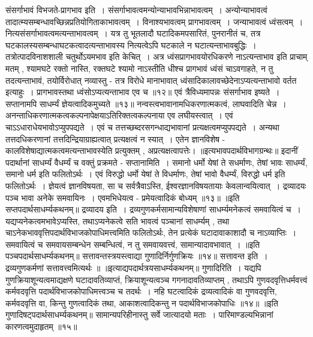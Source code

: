 संसर्गाभावं विभजते-प्रागभाव इति~। संसर्गाभावत्वमन्योन्याभावभिन्नाभावत्वम्~। अन्योन्याभावत्वं तादात्म्यसम्बन्धावच्छिन्नप्रतियोगिताकाभावत्वम्~।
विनाश्यभावत्वम् प्रागभावत्वम्~। जन्याभावत्वं ध्वंसत्वम्~। नित्यसंसर्गाभावत्वमत्यन्ताभावत्वम्~। यत्र तु भूतलादौ घटादिकमपसारितं, पुनरानीतं च, तत्र
घटकालस्यसम्बन्धाघटकत्वादत्यन्ताभावस्य नित्यत्वेऽपि घटकाले न घटात्यन्ताभावबुद्धिः~। तत्रोत्पादविनाशशाली चतुर्थोऽयमभाव इति केचित्~।
अत्र ध्वंसप्रागभावयोरधिकरणे नाऽत्यन्ताभाव इति प्राचाम् मतम् , श्यामघटे रक्तो नास्ति, रक्तघटे श्यामो नाऽस्तीति धीश्च प्रागभावं ध्वंसं चाऽवगाहते, न तु
तदत्यन्ताभावं, तयोर्विरोधात् नव्यास्तु - तत्र विरोधे मानाभावात् ध्वंसादिकालावच्छेदेनाऽप्यत्यन्ताभावो वर्तत इत्याहुः~।
प्रागभावस्तथा ध्वंसोऽप्यत्यन्ताभाव एव च ॥१२॥
एवं त्रैविध्यमापन्नः संसर्गाभाव इष्यते~।
सप्तानामपि साधर्म्यं ज्ञेयत्वादिकमुच्यते ॥१३॥
नन्वस्त्वभावानामधिकरणात्मकत्वं, लाघवादिति चेन्न~। अनन्ताधिकरणात्मकत्वकल्पनापेक्षयाऽतिरिक्तत्वकल्पनाया एव लघीयस्त्वात्~। एवं चाऽऽधाराधेयभावोऽप्युपपद्यते~।
एवं च तत्तच्छब्दरसगन्धाद्यभावानां प्रत्यक्षत्वमप्युपपद्यते~। अन्यथा तत्तदधिकरणानां तत्तदिन्द्रियाग्राह्यत्वात् प्रत्यक्षत्वं न स्यात्~।
एतेन ज्ञानविशेष - कालविशेषाद्यात्मकत्वमत्यन्ताभावस्येति प्रत्युक्तम् , अप्रत्यक्षत्वापत्तेः।
॥इत्यभावपदार्थविभागग्रन्थः॥
इदानीं पदार्थानां साधर्म्यं वैधर्म्यं च वक्तुं प्रक्रमते - सप्तानामिति~। समानो धर्मो येषां ते सधर्माणः, तेषां भावः साधर्म्यं, समानो धर्म इति फलितोऽर्थः~। एवं विरुद्धो
धर्मो येषां ते विधर्माणः, तेषां भावो वैधर्म्यं, विरुद्धो धर्म इति फलितोऽर्थः~। ज्ञेयत्वं ज्ञानविषयता, सा च सर्वत्रैवाऽस्ति, ईश्वरज्ञानविषयतायाः केवलान्वयित्वात्~।
द्रव्यादयः पञ्च भावा अनेके समवायिनः~।
एवमभिधेयत्व - प्रमेयत्वादिकं बोध्यम् ॥१३॥
॥इति सप्तपदार्थसाधर्म्यकथनम्॥
द्रव्यादय इति~। द्रव्यगुणकर्मसामान्यविशेषाणां साधर्म्यमनेकत्वं समवायित्वं च~। यद्यप्यनेकत्वमभावेऽप्यस्ति, तथाऽप्यनेकत्वे सति भावत्वं पञ्चानां साधर्म्यम् ,
तथा चाऽनेकभाववृत्तिपदार्थविभाजकोपाधिमत्त्वमिति फलितोऽर्थः, तेन प्रत्येकं घटादावाकाशादौ च नाऽव्याप्तिः~।
समवायित्वं च समवायसम्बन्धेन सम्बन्धित्वं, न तु समवायवत्त्वं, सामान्यादावभावात्~।
॥इति पञ्चपदार्थसाधर्म्यकथनम्॥
सत्तावन्तस्त्रयस्त्वाद्या गुणादिर्निर्गुणक्रियः ॥१४॥
सत्तावन्त इति~। द्रव्यगुणकर्मणां सत्तावत्त्वमित्यर्थः ॥
॥इत्याद्यपदार्थत्रयसाधर्म्यकथनम्॥
गुणादिरिति~। यद्यपि गुणक्रियाशून्यत्वमाद्यक्षणे घटादावतिव्याप्तं, क्रियाशून्यत्वञ्च गगनादावतिव्याप्तम् , तथाऽपि गुणवदवृत्तिधर्मवत्त्वं कर्मवदवृत्ति
पदार्थविभाजकोपाधिमत्त्वञ्च च तदर्थः~। नहि घटत्वादिकं द्रव्यत्वादिकं वा गुणवदवृत्ति, कर्मवदवृत्ति वा, किन्तु गुणत्वादिकं तथा, आकाशत्वादिकन्तु न पदार्थविभाजकोपाधिः ॥१४॥
॥इति गुणादिषट्‍पदार्थसाधर्म्यकथनम्॥
सामान्यपरिहीनास्तु सर्वे जात्यादयो मताः~।
पारिमाण्डल्यभिन्नानां कारणत्वमुदाहृतम् ॥१५॥
